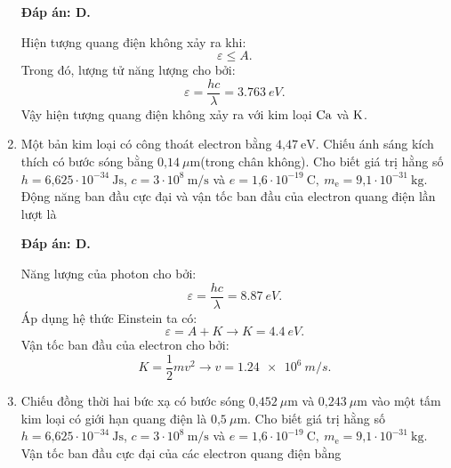 \begin{enumerate}[label=\bfseries Câu \arabic*:]
	\loigiai
	{		\textbf{Đáp án: D.}
		
Hiện tượng quang điện không xảy ra khi:
$$
	\varepsilon \leq A.
$$
Trong đó, lượng tử năng lượng cho bởi:
$$
	\varepsilon = \dfrac{hc}{\lambda} = \SI{3,763}{eV}.
$$
Vậy hiện tượng quang điện không xảy ra với kim loại $ \ce{Ca} $ và $ \ce{K} $.
	}
	
\item {} 
	
	\cauhoi
	{Một bản kim loại có công thoát electron bằng $\text{4,47}\ \text{eV}$. Chiếu ánh sáng kích thích có bước sóng bằng $\text{0,14}\ \mu\text{m}$(trong chân không). Cho biết giá trị hằng số $h=\text{6,625}\cdot 10^{-34}\ \text{Js}$, $c=3\cdot 10^8\ \text{m/s}$ và $e=\text{1,6}\cdot 10^{-19}\ \text{C}, \ m_\text{e}=\text{9,1}\cdot 10^{-31}\ \text{kg}$. Động năng ban đầu cực đại và vận tốc ban đầu của electron quang điện lần lượt là
	}
	
	\loigiai
	{		\textbf{Đáp án: D.}

Năng lượng của photon cho bởi:
$$
	\varepsilon = \dfrac{hc}{\lambda} = \SI{8.87}{eV}.
$$
Áp dụng hệ thức Einstein ta có:
$$
	\varepsilon = A + K \rightarrow K = \SI{4,4}{eV}.
$$
Vận tốc ban đầu của electron cho bởi:
$$
	K = \dfrac{1}{2}mv^{2} \rightarrow v = \SI{1,24 e6}{m/s}.
$$
	}
	
	\item {} 
	
	\cauhoi
	{Chiếu đồng thời hai bức xạ có bước sóng $\text{0,452}\ \mu \text{m}$   và $\text{0,243}\ \mu\text{m}$ vào một tấm kim loại có giới hạn quang điện là $\text{0,5}\ \mu\text{m}$. Cho biết giá trị hằng số $h=\text{6,625}\cdot 10^{-34}\ \text{Js}$, $c=3\cdot 10^8\ \text{m/s}$ và $e=\text{1,6}\cdot 10^{-19}\ \text{C}, \ m_\text{e}=\text{9,1}\cdot 10^{-31}\ \text{kg}$. Vận tốc ban đầu cực đại của các electron quang điện bằng
	}
	

\end{enumerate}
